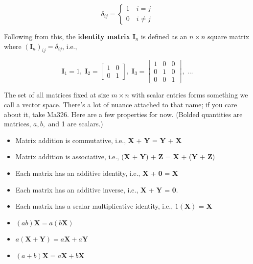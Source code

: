 \documentclass{report}
\begin{document}
\begin{onehalfspacing}
\begin{flushleft}
\vspace{-0.1in}
\begin{equation*}
    \delta_{ij} = \left\{ \begin{array}{ll}
        1 \quad i=j\\
        0 \quad i \neq j
    \end{array} \right.
\end{equation*}

Following from this, the \textbf{identity matrix} \(\textbf{I}_n\) is defined as an \(n\times n\) square matrix where \((\textbf{I}_n)_{ij} = \delta_{ij}\), i.e.,

\vspace{-0.1in}
\[\textbf{I}_1 = 1, \; \textbf{I}_2 = \begin{bmatrix}
    1 & 0 \\ 0 & 1
\end{bmatrix}, \; \textbf{I}_3 = \begin{bmatrix}
    1 & 0 & 0 \\ 0 & 1 & 0 \\ 0 & 0 & 1
\end{bmatrix}, \; \dots\]

The set of all matrices fixed at size \(m \times n\) with scalar entries forms something we call a vector space. There's a lot of nuance attached to that name; if you care about it, take Ma326. Here are a few properties for now. (Bolded quantities are matrices, \(a, b,\) and 1 are scalars.)

\begin{itemize}[noitemsep]
    \item Matrix addition is commutative, i.e., \textbf{X} + \textbf{Y} = \textbf{Y} + \textbf{X}
    \item Matrix addition is associative, i.e., (\textbf{X} + \textbf{Y}) + \textbf{Z} = \textbf{X} + (\textbf{Y} + \textbf{Z})
    \item Each matrix has an additive identity, i.e., \textbf{X} + \textbf{0} = \textbf{X}
    \item Each matrix has an additive inverse, i.e., \textbf{X} + \textbf{Y} = \textbf{0}.
    \item Each matrix has a scalar multiplicative identity, i.e., \(1 (\textbf{X})\) = \textbf{X}
    \item \((ab)\textbf{X} = a(b\textbf{X})\)
    \item \(a(\textbf{X} + \textbf{Y}) = a\textbf{X} + a\textbf{Y}\)
    \item \((a+b)\textbf{X} = a\textbf{X} + b\textbf{X}\)
\end{itemize}


\end{flushleft}
\end{onehalfspacing}
\end{document}
